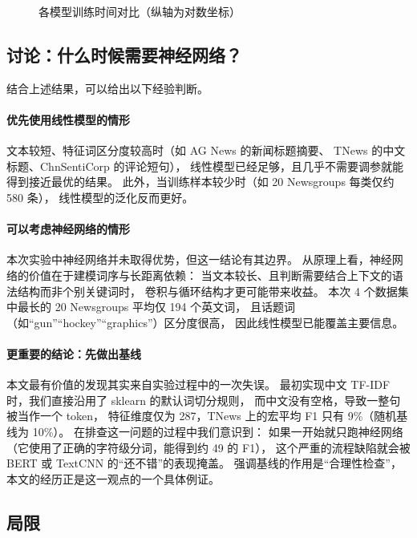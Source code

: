 \documentclass[11pt, a4paper]{ctexart}
\begin{document}


\begin{figure}[htbp]
\centering

\caption{各模型训练时间对比（纵轴为对数坐标）}
\label{fig:time}
\end{figure}

\subsection{讨论：什么时候需要神经网络？}

结合上述结果，可以给出以下经验判断。

\paragraph{优先使用线性模型的情形}
文本较短、特征词区分度较高时（如 AG News 的新闻标题摘要、
TNews 的中文标题、ChnSentiCorp 的评论短句），
线性模型已经足够，且几乎不需要调参就能得到接近最优的结果。
此外，当训练样本较少时（如 20 Newsgroups 每类仅约 580 条），
线性模型的泛化反而更好。

\paragraph{可以考虑神经网络的情形}
本次实验中神经网络并未取得优势，但这一结论有其边界。
从原理上看，神经网络的价值在于建模词序与长距离依赖：
当文本较长、且判断需要结合上下文的语法结构而非个别关键词时，
卷积与循环结构才更可能带来收益。
本次 4 个数据集中最长的 20 Newsgroups 平均仅 194 个英文词，
且话题词（如“gun”“hockey”“graphics”）区分度很高，
因此线性模型已能覆盖主要信息。

\paragraph{更重要的结论：先做出基线}
本文最有价值的发现其实来自实验过程中的一次失误。
最初实现中文 TF-IDF 时，我们直接沿用了 sklearn 的默认词切分规则，
而中文没有空格，导致一整句被当作一个 token，
特征维度仅为 287，TNews 上的宏平均 F1 只有 9\%（随机基线为 10\%）。
在排查这一问题的过程中我们意识到：
如果一开始就只跑神经网络（它使用了正确的字符级分词，能得到约 49 的 F1），
这个严重的流程缺陷就会被 BERT 或 TextCNN 的“还不错”的表现掩盖。
\citet{lin2023linear} 强调基线的作用是“合理性检查”，
本文的经历正是这一观点的一个具体例证。

\subsection{局限}
\end{document}

